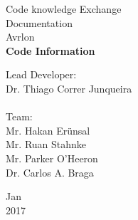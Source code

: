 \documentclass[a4paper, 12pt]{article}
\begin{document}

\begin{titlepage}
	\begin{center}
	

		\Huge{Code knowledge Exchange}\\
		\large{Documentation}\\ 
		\large{Avrlon}\\ 
		\vspace{15pt}
        \vspace{95pt}
        \textbf{\LARGE{Code Information}}\\
		\vspace{3,5cm}
	\end{center}
	
	\begin{flushleft}
		\begin{tabbing}
			Lead Developer: \\
            Dr. Thiago Correr Junqueira \\
			 \\
			Team: \\
            Mr. Hakan Erünsal\\
            Mr. Ruan Stahnke\\
            Mr. Parker O'Heeron\\
            Dr. Carlos A. Braga\\
            
	\end{tabbing}
 \end{flushleft}
	\vspace{1cm}
	
	\begin{center}
		\vspace{\fill}
			 Jan\\
		 2017
			\end{center}
\end{titlepage}

\end{document}
